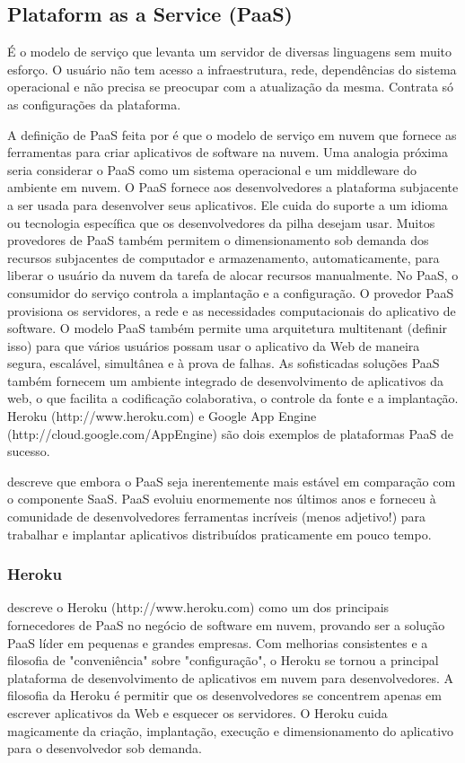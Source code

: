 \subsection{Plataform as a Service (PaaS)}

É o modelo de serviço que levanta um servidor de diversas linguagens sem muito esforço. O usuário não tem acesso a infraestrutura, rede, dependências do sistema operacional e não precisa se preocupar com a atualização da mesma. Contrata só as configurações da plataforma.

A definição de PaaS feita por \cite{Hanjura2014} é que o modelo de serviço em nuvem que fornece as ferramentas para criar aplicativos de software na nuvem. Uma analogia próxima seria considerar o PaaS como um sistema operacional e um middleware do ambiente em nuvem. O PaaS fornece aos desenvolvedores a plataforma subjacente a ser usada para desenvolver seus aplicativos. Ele cuida do suporte a um idioma ou tecnologia específica que os desenvolvedores da pilha desejam usar. Muitos provedores de PaaS também permitem o dimensionamento sob demanda dos recursos subjacentes de computador e armazenamento, automaticamente, para liberar o usuário da nuvem da tarefa de alocar recursos manualmente. No PaaS, o consumidor do serviço controla a implantação e a configuração. O provedor PaaS provisiona os servidores, a rede e as necessidades computacionais do aplicativo de software. O modelo PaaS também permite uma arquitetura multitenant (definir isso) para que vários usuários possam usar o aplicativo da Web de maneira segura, escalável, simultânea e à prova de falhas. As sofisticadas soluções PaaS também fornecem um ambiente integrado de desenvolvimento de aplicativos da web, o que facilita a codificação colaborativa, o controle da fonte e a implantação. Heroku (http://www.heroku.com) e Google App Engine (http://cloud.google.com/AppEngine) são dois exemplos de plataformas PaaS de sucesso.

\cite{Hanjura2014} descreve que embora o PaaS seja inerentemente mais estável em comparação com o componente SaaS. PaaS evoluiu enormemente nos últimos anos e forneceu à comunidade de desenvolvedores ferramentas incríveis (menos adjetivo!) para trabalhar e implantar aplicativos distribuídos praticamente em pouco tempo.

\subsubsection{Heroku}

\cite{Hanjura2014} descreve o Heroku (http://www.heroku.com) como um dos principais fornecedores de PaaS no negócio de software em nuvem, provando ser a solução PaaS líder em pequenas e grandes empresas. Com melhorias consistentes e a filosofia de "conveniência" sobre "configuração", o Heroku se tornou a principal plataforma de desenvolvimento de aplicativos em nuvem para desenvolvedores. A filosofia da Heroku é permitir que os desenvolvedores se concentrem apenas em escrever aplicativos da Web e esquecer os servidores. O Heroku cuida magicamente da criação, implantação, execução e dimensionamento do aplicativo para o desenvolvedor sob demanda.


